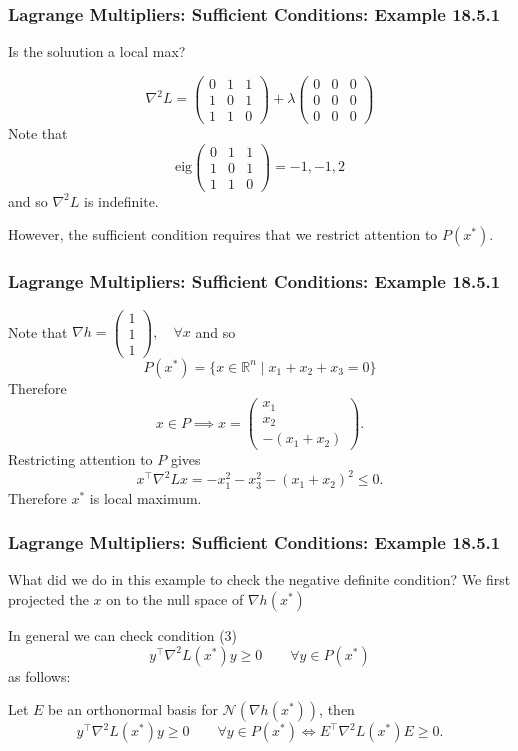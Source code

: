 \documentclass{beamer}
\begin{document}
\begin{frame}\frametitle{Lagrange Multipliers: Sufficient Conditions: Example 18.5.1}
	Is the soluution a local max?
	
	\[ 
		\nabla^2L 
			= \begin{pmatrix}
	    		0 & 1 & 1\\
	    		1 & 0 & 1\\
	    		1 & 1 & 0
	  		  \end{pmatrix} 
	  		  + \lambda \begin{pmatrix}
	    					0 & 0 & 0\\
	    					0 & 0 & 0\\
	    					0 & 0 & 0
	  					\end{pmatrix}
	\]
	Note that 
	\[
		\text{eig}
			\begin{pmatrix}
	    		0 & 1 & 1\\
	    		1 & 0 & 1\\
	    		1 & 1 & 0   
	  		\end{pmatrix} = -1, -1, 2 
	\]
	and so $\nabla^2L$ is indefinite.  
	
	\vfill
	
	However, the sufficient condition requires that we restrict attention to $P(x^{\ast})$.
\end{frame}

\begin{frame}\frametitle{Lagrange Multipliers: Sufficient Conditions: Example 18.5.1}
	Note that 
	$\nabla h 
		= \begin{pmatrix}
	    	1\\1\\1
	  	  \end{pmatrix}, \quad \forall x$ 
	and so
	\[ 
		P(x^{\ast}) = \{x\in \mathbb{R}^n \mid x_1 + x_2 + x_3 = 0 \}
	\]
	Therefore
	\[
		x\in P \implies  
		x = \begin{pmatrix}
	    		x_1\\
	    		x_2\\
	    		-(x_1 + x_2)
	  		\end{pmatrix}.
	\]
	Restricting attention to $P$ gives
	\[ 
		x^\top \nabla^2 L x = -x_1^2 - x_3^2 - (x_1 + x_2)^2 \leq 0.
	\]	
	Therefore $x^{\ast}$ is local maximum.
\end{frame}

\begin{frame}\frametitle{Lagrange Multipliers: Sufficient Conditions: Example 18.5.1}
	What did we do in this example to check the negative definite condition?  We first projected the $x$ on to the null space of $\nabla h(x^{\ast})$
	
	In general we can check condition (3)
	\[  
		y^\top \nabla^2L(x^{\ast})y \geq 0 \qquad \forall y \in P(x^{\ast}) 
	\]
	as follows:
	
	\vfill
	
	Let $E$ be an orthonormal basis for $\mathcal{N}(\nabla h(x^{\ast}))$, then
	\[ 
		y^\top \nabla^2L(x^{\ast})y \geq 0 \qquad \forall y \in P(x^{\ast}) \iff E^\top \nabla^2 L(x^{\ast}) E \geq 0.
	\]	
\end{frame}
\end{document}
